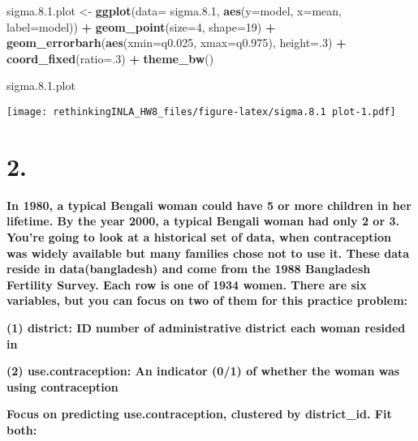 \documentclass[
]{article}
\newenvironment{Shaded}{\begin{snugshade}}{\end{snugshade}}
\newcommand{\DataTypeTok}[1]{\textcolor[rgb]{0.13,0.29,0.53}{#1}}
\newcommand{\DecValTok}[1]{\textcolor[rgb]{0.00,0.00,0.81}{#1}}
\newcommand{\FloatTok}[1]{\textcolor[rgb]{0.00,0.00,0.81}{#1}}
\newcommand{\KeywordTok}[1]{\textcolor[rgb]{0.13,0.29,0.53}{\textbf{#1}}}
\newcommand{\NormalTok}[1]{#1}
\newcommand{\OperatorTok}[1]{\textcolor[rgb]{0.81,0.36,0.00}{\textbf{#1}}}
\newcommand{\StringTok}[1]{\textcolor[rgb]{0.31,0.60,0.02}{#1}}
\begin{document}
\begin{Shaded}
\begin{Highlighting}[]
\NormalTok{sigma.}\DecValTok{8}\NormalTok{.}\FloatTok{1.}\NormalTok{plot <-}\StringTok{  }\KeywordTok{ggplot}\NormalTok{(}\DataTypeTok{data=}\NormalTok{ sigma.}\FloatTok{8.1}\NormalTok{, }\KeywordTok{aes}\NormalTok{(}\DataTypeTok{y=}\NormalTok{model, }\DataTypeTok{x=}\NormalTok{mean, }\DataTypeTok{label=}\NormalTok{model)) }\OperatorTok{+}
\StringTok{    }\KeywordTok{geom_point}\NormalTok{(}\DataTypeTok{size=}\DecValTok{4}\NormalTok{, }\DataTypeTok{shape=}\DecValTok{19}\NormalTok{) }\OperatorTok{+}
\StringTok{    }\KeywordTok{geom_errorbarh}\NormalTok{(}\KeywordTok{aes}\NormalTok{(}\DataTypeTok{xmin=}\NormalTok{q0}\FloatTok{.025}\NormalTok{, }\DataTypeTok{xmax=}\NormalTok{q0}\FloatTok{.975}\NormalTok{), }\DataTypeTok{height=}\NormalTok{.}\DecValTok{3}\NormalTok{) }\OperatorTok{+}
\StringTok{    }\KeywordTok{coord_fixed}\NormalTok{(}\DataTypeTok{ratio=}\NormalTok{.}\DecValTok{3}\NormalTok{) }\OperatorTok{+}
\StringTok{    }\KeywordTok{theme_bw}\NormalTok{()}

\NormalTok{sigma.}\DecValTok{8}\NormalTok{.}\FloatTok{1.}\NormalTok{plot}
\end{Highlighting}
\end{Shaded}

\texttt{[image: rethinkingINLA\_HW8\_files/figure-latex/sigma.8.1 plot-1.pdf]}

\hypertarget{section-1}{%
\section{2.}\label{section-1}}

\textbf{In 1980, a typical Bengali woman could have 5 or more children
in her lifetime. By the year 2000, a typical Bengali woman had only 2 or
3. You're going to look at a historical set of data, when contraception
was widely available but many families chose not to use it. These data
reside in data(bangladesh) and come from the 1988 Bangladesh Fertility
Survey. Each row is one of 1934 women. There are six variables, but you
can focus on two of them for this practice problem:}

\textbf{(1) district: ID number of administrative district each woman
resided in}

\textbf{(2) use.contraception: An indicator (0/1) of whether the woman
was using contraception}

\textbf{Focus on predicting use.contraception, clustered by
district\_id. Fit both:}
\end{document}
